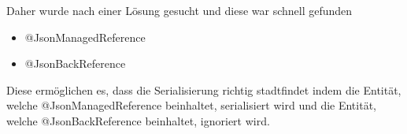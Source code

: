Daher wurde nach einer Lösung gesucht und diese war schnell gefunden

\begin{itemize}
    \item @JsonManagedReference 
    \item @JsonBackReference
\end{itemize}


Diese ermöglichen es, dass die Serialisierung richtig stadtfindet indem die Entität, welche @JsonManagedReference beinhaltet, serialisiert wird  und die Entität, welche @JsonBackReference beinhaltet, ignoriert wird.\cite{Jackson}